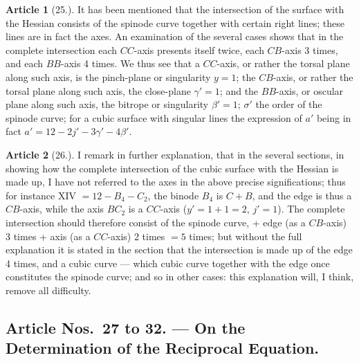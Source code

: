 \documentclass[11pt,a4paper]{article}
\theoremstyle{definition}
\newtheorem{art}{Article}
\begin{document}
\begin{art}[25.]
It has been mentioned that the intersection of the surface with the Hessian consists of the spinode curve together with certain right lines; these lines are in fact the axes. An examination of the several cases shows that in the complete intersection each $CC$-axis presents itself twice, each $CB$-axis 3 times, and each $BB$-axis 4 times. We thus see that a $CC$-axis, or rather the torsal plane along such axis, is the pinch-plane or singularity $y = 1$; the $CB$-axis, or rather the torsal plane along such axis, the close-plane $\gamma' = 1$; and the $BB$-axis, or oscular plane along such axis, the bitrope or singularity $\beta' = 1$; $\sigma'$ the order of the spinode curve; for a cubic surface with singular lines the expression of $a'$ being in fact $a' = 12 - 2j' - 3\gamma' - 4\beta'$.
\end{art}

\begin{art}[26.]
I remark in further explanation, that in the several sections, in showing how the complete intersection of the cubic surface with the Hessian is made up, I have not referred to the axes in the above precise significations; thus for instance XIV $= 12 - B_4 - C_2$, the binode $B_4$ is $C + B$, and the edge is thus a $CB$-axis, while the axis $BC_2$ is a $CC$-axis ($y' = 1 + 1 = 2$, $j' = 1$). The complete intersection should therefore consist of the spinode curve, + edge (as a $CB$-axis) 3 times + axis (as a $CC$-axis) 2 times $= 5$ times; but without the full explanation it is stated in the section that the intersection is made up of the edge 4 times, and a cubic curve --- which cubic curve together with the edge once constitutes the spinode curve; and so in other cases: this explanation will, I think, remove all difficulty.
\end{art}

\newpage
\setcounter{page}{368}

\subsection*{Article Nos.~27 to 32. --- On the Determination of the Reciprocal Equation.}
\end{document}
